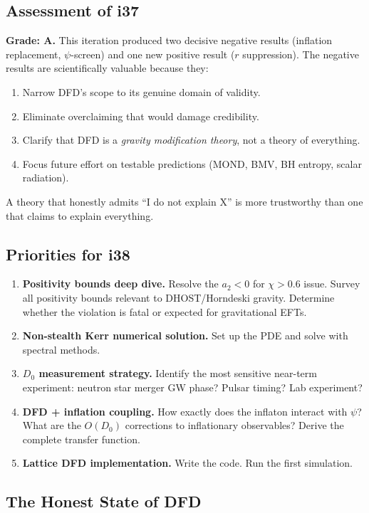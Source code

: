 \documentclass[11pt,a4paper]{article}
\begin{document}
\subsection{Assessment of i37}

\textbf{Grade: A.} This iteration produced two decisive negative results (inflation replacement, $\psi$-screen) and one new positive result ($r$ suppression). The negative results are scientifically valuable because they:
\begin{enumerate}
\item Narrow DFD's scope to its genuine domain of validity.
\item Eliminate overclaiming that would damage credibility.
\item Clarify that DFD is a \emph{gravity modification theory}, not a theory of everything.
\item Focus future effort on testable predictions (MOND, BMV, BH entropy, scalar radiation).
\end{enumerate}

A theory that honestly admits ``I do not explain X'' is more trustworthy than one that claims to explain everything.

\subsection{Priorities for i38}

\begin{enumerate}
\item \textbf{Positivity bounds deep dive.} Resolve the $a_2 < 0$ for $\chi > 0.6$ issue. Survey all positivity bounds relevant to DHOST/Horndeski gravity. Determine whether the violation is fatal or expected for gravitational EFTs.
\item \textbf{Non-stealth Kerr numerical solution.} Set up the PDE and solve with spectral methods.
\item \textbf{$D_0$ measurement strategy.} Identify the most sensitive near-term experiment: neutron star merger GW phase? Pulsar timing? Lab experiment?
\item \textbf{DFD + inflation coupling.} How exactly does the inflaton interact with $\psi$? What are the $O(D_0)$ corrections to inflationary observables? Derive the complete transfer function.
\item \textbf{Lattice DFD implementation.} Write the code. Run the first simulation.
\end{enumerate}

\subsection{The Honest State of DFD}
\end{document}
